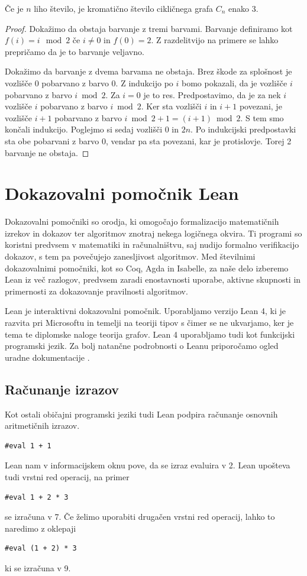 \documentclass[mat1]{fmfdelo}
\begin{document}
\begin{lema}
    Če je $n$ liho število, je kromatično število cikličnega grafa $C_n$ enako 3.
\end{lema}
\begin{proof}
    Dokažimo da obstaja barvanje z tremi barvami. Barvanje definiramo kot $f(i) = i\mod 2$ če $i \neq 0$ in $f(0) = 2$.
    Z razdelitvijo na primere se lahko prepričamo da je to barvanje veljavno.

    Dokažimo da barvanje z dvema barvama ne obstaja. Brez škode za splošnost je vozlišče $0$ pobarvano z barvo $0$.
    Z indukcijo po $i$ bomo pokazali, da je vozlišče $i$ pobarvano z barvo $i\bmod 2$.
    Za $i=0$ je to res. Predpostavimo, da je za nek $i$ vozlišče $i$ pobarvano z barvo $i\bmod 2$.
    Ker sta vozlišči $i$ in $i+1$ povezani, je vozlišče $i+1$ pobarvano z barvo $i\bmod 2 + 1 = (i+1)\bmod 2$.
    S tem smo končali indukcijo.
    Poglejmo si sedaj vozlišči $0$ in $2n$. Po indukcijski predpostavki sta obe pobarvani z barvo $0$, 
    vendar pa sta povezani, kar je protislovje. Torej 2 barvanje ne obstaja.
\end{proof}


\section{Dokazovalni pomočnik Lean}
Dokazovalni pomočniki so orodja, ki omogočajo formalizacijo matematičnih izrekov in dokazov ter algoritmov znotraj nekega logičnega okvira. 
Ti programi so koristni predvsem v matematiki in računalništvu, saj nudijo formalno verifikacijo dokazov, s tem pa 
povečujejo zanesljivost algoritmov.
Med številnimi dokazovalnimi pomočniki, kot so Coq, Agda in Isabelle, za naše delo izberemo Lean iz več razlogov, predvsem
zaradi enostavnosti uporabe, aktivne skupnosti in primernosti za dokazovanje pravilnosti algoritmov. 

Lean je interaktivni dokazovalni pomočnik. Uporabljamo verzijo Lean 4, ki je razvita pri Microsoftu in temelji na teoriji tipov
s čimer se ne ukvarjamo, ker je tema te diplomske naloge teorija grafov. Lean 4 uporabljamo tudi
kot funkcijski programski jezik. Za bolj natančne podrobnosti o Leanu priporočamo ogled uradne dokumentacije
\cite{LeanD}. 


\subsection{Računanje izrazov}
Kot ostali običajni programski jeziki tudi Lean podpira računanje osnovnih aritmetičnih izrazov.
\begin{lstlisting}
#eval 1 + 1
\end{lstlisting}
Lean nam v informacijskem oknu pove, da se izraz evaluira v 2. Lean upošteva tudi vrstni red operacij, na primer
\begin{lstlisting}
#eval 1 + 2 * 3
\end{lstlisting}
se izračuna v 7. Če želimo uporabiti drugačen vrstni red operacij, lahko to naredimo z oklepaji
\begin{lstlisting}
#eval (1 + 2) * 3
\end{lstlisting}
ki se izračuna v 9.
\end{document}
